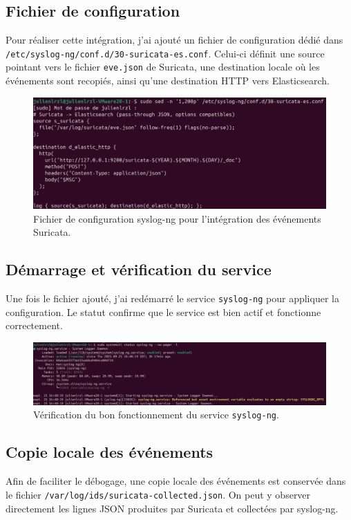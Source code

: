 \subsection{Fichier de configuration}
Pour réaliser cette intégration, j’ai ajouté un fichier de configuration dédié dans \texttt{/etc/syslog-ng/conf.d/30-suricata-es.conf}.  
Celui-ci définit une source pointant vers le fichier \texttt{eve.json} de Suricata, une destination locale où les événements sont recopiés, ainsi qu’une destination HTTP vers Elasticsearch.

\begin{figure}[H]
    \centering
    \includegraphics[width=0.9\linewidth]{assets/figures/sng-conf.png}
    \caption{Fichier de configuration syslog-ng pour l’intégration des événements Suricata.}
\end{figure}

\subsection{Démarrage et vérification du service}
Une fois le fichier ajouté, j’ai redémarré le service \texttt{syslog-ng} pour appliquer la configuration. Le statut confirme que le service est bien actif et fonctionne correctement.

\begin{figure}[H]
    \centering
    \includegraphics[width=0.9\linewidth]{assets/figures/sng-status.png}
    \caption{Vérification du bon fonctionnement du service \texttt{syslog-ng}.}
\end{figure}

\subsection{Copie locale des événements}
Afin de faciliter le débogage, une copie locale des événements est conservée dans le fichier \texttt{/var/log/ids/suricata-collected.json}. On peut y observer directement les lignes JSON produites par Suricata et collectées par syslog-ng.

